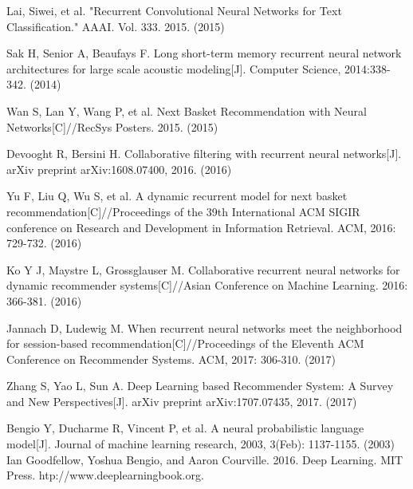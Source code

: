 \documentclass[runningheads]{llncs}
\begin{document}
\begin{thebibliography}{8}
 Lai, Siwei, et al. "Recurrent Convolutional Neural Networks for Text Classification." AAAI. Vol. 333. 2015. (2015)

 Sak H, Senior A, Beaufays F. Long short-term memory recurrent neural network architectures for large scale acoustic modeling[J]. Computer Science, 2014:338-342. (2014)

 Wan S, Lan Y, Wang P, et al. Next Basket Recommendation with Neural Networks[C]//RecSys Posters. 2015. (2015)

 Devooght R, Bersini H. Collaborative filtering with recurrent neural networks[J]. arXiv preprint arXiv:1608.07400, 2016. (2016)

 Yu F, Liu Q, Wu S, et al. A dynamic recurrent model for next basket recommendation[C]//Proceedings of the 39th International ACM SIGIR conference on Research and Development in Information Retrieval. ACM, 2016: 729-732. (2016)

 Ko Y J, Maystre L, Grossglauser M. Collaborative recurrent neural networks for dynamic recommender systems[C]//Asian Conference on Machine Learning. 2016: 366-381. (2016)

 Jannach D, Ludewig M. When recurrent neural networks meet the neighborhood for session-based recommendation[C]//Proceedings of the Eleventh ACM Conference on Recommender Systems. ACM, 2017: 306-310. (2017)

 Zhang S, Yao L, Sun A. Deep Learning based Recommender System: A Survey and New Perspectives[J]. arXiv preprint arXiv:1707.07435, 2017. (2017)

 Bengio Y, Ducharme R, Vincent P, et al. A neural probabilistic language model[J]. Journal of machine learning research, 2003, 3(Feb): 1137-1155. (2003)
 Ian Goodfellow, Yoshua Bengio, and Aaron Courville. 2016. Deep Learning. MIT Press. htp://www.deeplearningbook.org.
\end{thebibliography}
\end{document}
